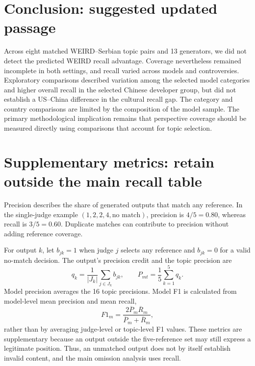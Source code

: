 \section*{Conclusion: suggested updated passage}
Across eight matched WEIRD--Serbian topic pairs and 13 generators,
we did not detect the predicted WEIRD recall advantage. Coverage
nevertheless remained incomplete in both settings, and recall varied
across models and controversies. Exploratory comparisons described
variation among the selected model categories and higher overall recall
in the selected Chinese developer group, but did not establish a
US--China difference in the cultural recall gap. The category and
country comparisons are limited by the composition of the model sample.
The primary methodological implication remains that perspective
coverage should be measured directly using comparisons that account
for topic selection.

\clearpage
\section*{Supplementary metrics: retain outside the main recall table}
Precision describes the share of generated outputs that match any
reference. In the single-judge example $(1,2,2,4,\text{no match})$,
precision is $4/5=0.80$, whereas recall is $3/5=0.60$. Duplicate matches
can contribute to precision without adding reference coverage.

For output $k$, let $b_{jk}=1$ when judge $j$ selects any reference
and $b_{jk}=0$ for a valid no-match decision. The output's precision
credit and the topic precision are
\[
q_k=\frac{1}{|J_k|}\sum_{j\in J_k}b_{jk},
\qquad P_{mt}=\frac15\sum_{k=1}^{5}q_k.
\]
Model precision averages the 16 topic precisions. Model F1 is calculated
from model-level mean precision and mean recall,
\[
F1_m=\frac{2\overline P_m\overline R_m}{\overline P_m+\overline R_m},
\]
rather than by averaging judge-level or topic-level F1 values. These
metrics are supplementary because an output outside the five-reference
set may still express a legitimate position. Thus, an unmatched output
does not by itself establish invalid content, and the main omission
analysis uses recall.
